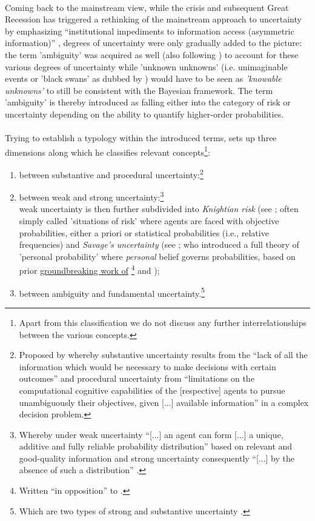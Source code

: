 \documentclass[a4paper,11pt,listof=nochaptergap,oneside,pointednumbers,bibtotoc,bigheadings,liststotoc]{scrbook}
\theoremstyle{mysatz}
\theoremstyle{mydefinition}
\theoremstyle{mybemerkung}
\begin{document}
\\
Coming back to the mainstream view, while the crisis and subsequent Great Recession has triggered a rethinking of the mainstream approach to uncertainty by emphasizing ``institutional impediments to information access (asymmetric information)'' \citep[p. 8]{dow:16}, degrees of uncertainty were only gradually added to the picture: the term 'ambiguity' was acquired as well (also following \citealp[p. 330]{camererandweber:92}) to account for these various degrees of uncertainty while 'unknown unknowns' (i.e. unimaginable events or 'black swans' as dubbed by \citealp{taleb:08}) would have to be seen as \textit{'knowable unknowns'} to still be consistent with the Bayesian framework. The term 'ambiguity' is thereby introduced as falling either into the category of risk or uncertainty depending on the ability to quantify higher-order probabilities.
\\
\\
Trying to establish a typology within the introduced terms, \citet{dequech:14}  sets up three dimensions along which he classifies relevant concepts\footnote{Apart from this classification we do not discuss any further interrelationships between the various concepts.}: 
\begin{enumerate}
	\item between substantive and procedural uncertainty:\footnote{Proposed by \citet[p. 145]{dosiandegidi:91} whereby substantive uncertainty results from the ``lack of all the information which would be necessary to make decisions with certain outcomes'' and procedural uncertainty from ``limitations on the computational cognitive capabilities of the [respective] agents to pursue unambiguously their objectives, given [...] available information'' in a complex decision problem. }
	\item between weak and strong uncertainty:\footnote{Whereby under weak uncertainty ``[...] an agent can form [...] a unique, additive and fully reliable probability distribution'' based on relevant and good-quality information and strong uncertainty consequently ``[...] by the absence of such a distribution'' \citep[p. 622/623]{dequech:14}.} \\
	weak uncertainty is then further subdivided into \textit{Knightian risk} (see \citet{knight:21}; often simply called 'situations of risk' where agents are faced with objective probabilities, either a priori or statistical probabilities (i.e., relative frequencies) and \textit{Savage's uncertainty} (see \citet{savage:54}; who introduced a full theory of 'personal probability' where \textit{personal} belief governs probabilities, based on prior \href{https://archive.org/stream/in.ernet.dli.2015.223806/2015.223806.The-Foundations#page/n289/mode/2up}{groundbreaking work of} \href{http://www.brunodefinetti.it/Link/Subjective%20Expected%20Utility%20-%20Intro.htm}{\citet{ramsey:26}\footnote{Written ``in opposition'' to \citet{keynes:21}.} and \citet{finetti:37}});
	\item between ambiguity and fundamental uncertainty.\footnote{Which are two types of strong and substantive uncertainty \citep{dequesh:00}.}
\end{enumerate}
\vspace{1cm}
\end{document}
